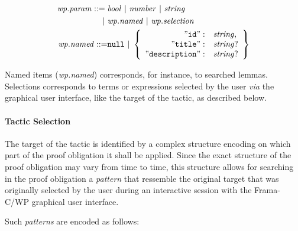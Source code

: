 \begin{align*}
    \mathit{wp.param} ::=\;&
    \mathit{bool} ~|~ \mathit{number} ~|~ \mathit{string} \\
    |\;&\mathit{wp.named} ~|~ \mathit{wp.selection} \\
    \mathit{wp.named} ::= &\mathtt{null} ~|~
    \left\{
    \begin{array}{rl}
        \mathtt{"id"} :& \mathit{string}, \\
        \mathtt{"title"} :& \mathit{string}? \\
        \mathtt{"description"} :& \mathit{string}?
    \end{array}
    \right\}
\end{align*}

Named items (\textit{wp.named}) corresponds, for instance, to searched lemmas.
Selections corresponds to terms or expressions selected by the user \emph{via}
the graphical user interface, like the target of the tactic, as described below.

\paragraph{Tactic Selection} The target of the tactic
is identified by a complex structure
encoding on which part of the proof obligation it shall be applied. Since the
exact structure of the proof obligation may vary from time to time, this structure
allows for searching in the proof obligation a \emph{pattern} that ressemble the
original target that was originally selected by the user during an interactive
session with the \textsf{Frama-C/WP} graphical user interface.

Such \emph{patterns} are encoded as follows:

\newcommand{\dash}{\rule[0.5ex]{1ex}{1pt}}


